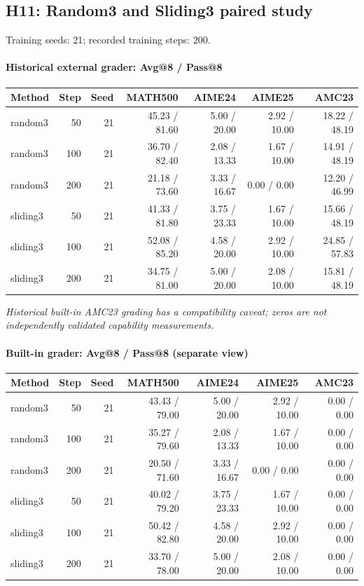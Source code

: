 \subsection{H11: Random3 and Sliding3 paired study}
\label{history:window_random_sliding}
Training seeds: 21; recorded training steps: 200.
\paragraph{Historical external grader: Avg@8 / Pass@8}
{\footnotesize\setlength{\tabcolsep}{3.5pt}
\begin{longtable}{@{}p{1.4in}rrrrrr@{}}
\toprule
Method & Step & Seed & MATH500 & AIME24 & AIME25 & AMC23 \\
\midrule\endhead
random3 & 50 & 21 & 45.23 / 81.60 & 5.00 / 20.00 & 2.92 / 10.00 & 18.22 / 48.19 \\
random3 & 100 & 21 & 36.70 / 82.40 & 2.08 / 13.33 & 1.67 / 10.00 & 14.91 / 48.19 \\
random3 & 200 & 21 & 21.18 / 73.60 & 3.33 / 16.67 & 0.00 / 0.00 & 12.20 / 46.99 \\
sliding3 & 50 & 21 & 41.33 / 81.80 & 3.75 / 23.33 & 1.67 / 10.00 & 15.66 / 48.19 \\
sliding3 & 100 & 21 & 52.08 / 85.20 & 4.58 / 20.00 & 2.92 / 10.00 & 24.85 / 57.83 \\
sliding3 & 200 & 21 & 34.75 / 81.00 & 5.00 / 20.00 & 2.08 / 10.00 & 15.81 / 48.19 \\
\bottomrule\end{longtable}
}
\emph{Historical built-in AMC23 grading has a compatibility caveat; zeros are not independently validated capability measurements.}
\paragraph{Built-in grader: Avg@8 / Pass@8 (separate view)}
{\footnotesize\setlength{\tabcolsep}{3.5pt}
\begin{longtable}{@{}p{1.4in}rrrrrr@{}}
\toprule
Method & Step & Seed & MATH500 & AIME24 & AIME25 & AMC23 \\
\midrule\endhead
random3 & 50 & 21 & 43.43 / 79.00 & 5.00 / 20.00 & 2.92 / 10.00 & 0.00 / 0.00 \\
random3 & 100 & 21 & 35.27 / 79.60 & 2.08 / 13.33 & 1.67 / 10.00 & 0.00 / 0.00 \\
random3 & 200 & 21 & 20.50 / 71.60 & 3.33 / 16.67 & 0.00 / 0.00 & 0.00 / 0.00 \\
sliding3 & 50 & 21 & 40.02 / 79.20 & 3.75 / 23.33 & 1.67 / 10.00 & 0.00 / 0.00 \\
sliding3 & 100 & 21 & 50.42 / 82.80 & 4.58 / 20.00 & 2.92 / 10.00 & 0.00 / 0.00 \\
sliding3 & 200 & 21 & 33.70 / 78.00 & 5.00 / 20.00 & 2.08 / 10.00 & 0.00 / 0.00 \\
\bottomrule\end{longtable}
}
